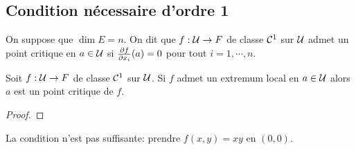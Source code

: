 
\sld{\vfill\pagebreak[5]}%
\subsection{Condition nécessaire d'ordre 1}

\begin{definition}
	On suppose que $\dim E = n$. On dit que $f:\mathcal{U} \to F$ de classe $\mathcal{C}^1$ sur $\mathcal{U}$ admet un point critique en $a\in\mathcal{U}$ si $\frac{\partial f}{\partial x_i}(a) = 0 $ pour tout $i=1,\cdots,n$.
\end{definition}

\begin{theorem}
	Soit  $f:\mathcal{U} \to F$ de classe $\mathcal{C}^1$ sur $\mathcal{U}$. Si $f$ admet un extremum local en $a\in \mathcal{U}$ alors $a$ est un point critique de $f$.
\end{theorem}
\begin{proof}
	\pl{\rep{4cm}}	
\end{proof}

\begin{exemple}
	La condition n'est pas suffisante: prendre $f(x,y) = xy$ en $(0,0)$.
	\pl{\rep{6cm}}	
\end{exemple}

